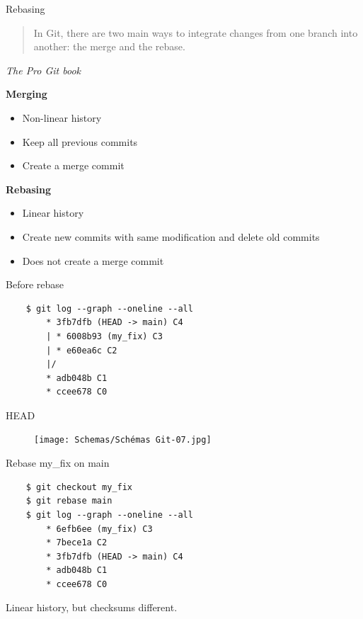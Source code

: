 \documentclass[10pt,aspectratio=169]{beamer}
\begin{document}
\begin{frame}[fragile]{Rebasing}
    \begin{quote}
        In Git, there are two main ways to integrate changes from one branch into another: the merge and the rebase.
    \end{quote}
    \begin{flushright}
        \textit{The Pro Git book}
    \end{flushright}

    \begin{minipage}{0.49\textwidth}
        \textbf{Merging}
        \begin{itemize}
            \item Non-linear history
            \item Keep all previous commits
            \item Create a merge commit
        \end{itemize}
    \end{minipage}
    \begin{minipage}{0.49\textwidth}
        \textbf{Rebasing}
        \begin{itemize}
            \item Linear history
            \item Create new commits with same modification and delete old commits
            \item Does not create a merge commit
        \end{itemize}
    \end{minipage}
\end{frame}

\begin{frame}[fragile]{Before rebase}
    \begin{verbatim}
    $ git log --graph --oneline --all
        * 3fb7dfb (HEAD -> main) C4
        | * 6008b93 (my_fix) C3
        | * e60ea6c C2
        |/
        * adb048b C1
        * ccee678 C0
    \end{verbatim}
\end{frame}

\begin{frame}[fragile]{HEAD}
    \begin{figure}
        \texttt{[image: Schemas/Schémas Git-07.jpg]}
    \end{figure}
\end{frame}

\begin{frame}[fragile]{Rebase my\_fix on main}
    \begin{verbatim}
    $ git checkout my_fix
    $ git rebase main
    $ git log --graph --oneline --all
        * 6efb6ee (my_fix) C3
        * 7bece1a C2
        * 3fb7dfb (HEAD -> main) C4
        * adb048b C1
        * ccee678 C0
    \end{verbatim}

    Linear history, but checksums different.
\end{frame}
\end{document}
